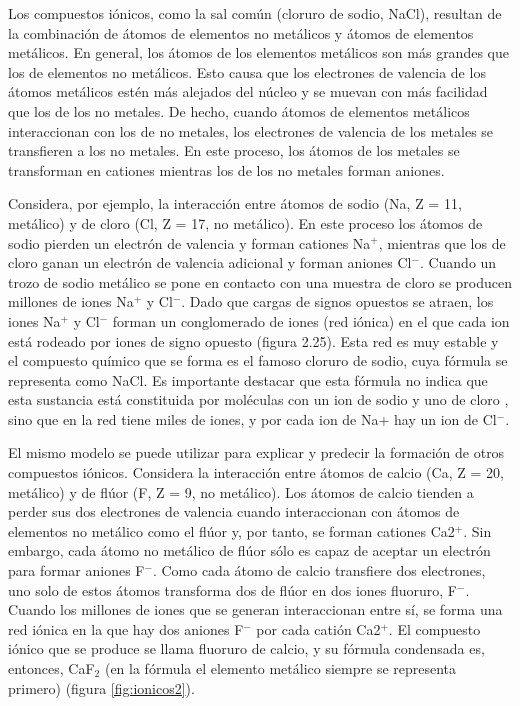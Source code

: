 Los compuestos iónicos, como la sal común (cloruro de sodio, NaCl), resultan de la combinación de
átomos de elementos no metálicos y átomos de elementos metálicos. En general, los átomos de los
elementos metálicos son más grandes que los de elementos no metálicos. Esto causa que los
electrones de valencia de los átomos metálicos estén más alejados del núcleo y se muevan con
más facilidad que los de los no metales. De hecho, cuando átomos de elementos metálicos
interaccionan con los de no metales, los electrones de valencia de los metales se transfieren a
los no metales. En este proceso, los átomos de los metales se transforman en cationes mientras
los de los no metales forman aniones.

Considera, por ejemplo, la interacción entre átomos de sodio (Na, Z = 11, metálico) y de cloro
(Cl, Z = 17, no metálico). En este proceso los átomos de sodio pierden un electrón de valencia
y forman cationes Na$^+$, mientras que los de cloro ganan un electrón de valencia adicional y forman
aniones Cl$^-$. Cuando un trozo de sodio metálico se pone en contacto con una muestra de cloro se
producen millones de iones Na$^+$ y Cl$^-$. Dado que cargas de signos opuestos se atraen, los iones
Na$^+$ y Cl$^-$ forman un conglomerado de iones (red iónica) en el que cada ion está rodeado por iones de signo opuesto (figura 2.25). Esta red es muy estable y el compuesto químico que se forma es el famoso cloruro de sodio, cuya fórmula se representa como NaCl. Es importante destacar que esta fórmula no indica que esta sustancia está constituida por moléculas con un ion de sodio y uno de cloro , sino que en la red tiene miles de iones, y por cada ion de Na+ hay un ion de Cl$^-$.

El mismo modelo se puede utilizar para explicar y predecir la formación de otros compuestos iónicos.
Considera la interacción entre átomos de calcio (Ca, Z = 20, metálico) y de flúor (F, Z = 9, no
metálico). Los átomos de calcio tienden a perder sus dos electrones de valencia cuando interaccionan
con átomos de elementos no metálico como el flúor y, por tanto, se forman cationes Ca2$^+$.
Sin embargo, cada átomo no metálico de flúor sólo es capaz de aceptar un electrón para formar
aniones F$^-$. Como cada átomo de calcio transfiere dos electrones, uno solo de estos átomos
transforma dos de flúor en dos iones fluoruro, F$^-$. Cuando los millones de iones que se generan
interaccionan entre sí, se forma una red iónica en la que hay dos aniones F$^-$ por cada
catión Ca2$^+$. El compuesto iónico que se produce se llama fluoruro de calcio, y su fórmula
condensada es, entonces, CaF$_2$ (en la fórmula el elemento metálico siempre se representa primero)
(figura \ref{fig:ionicos2}).\\

